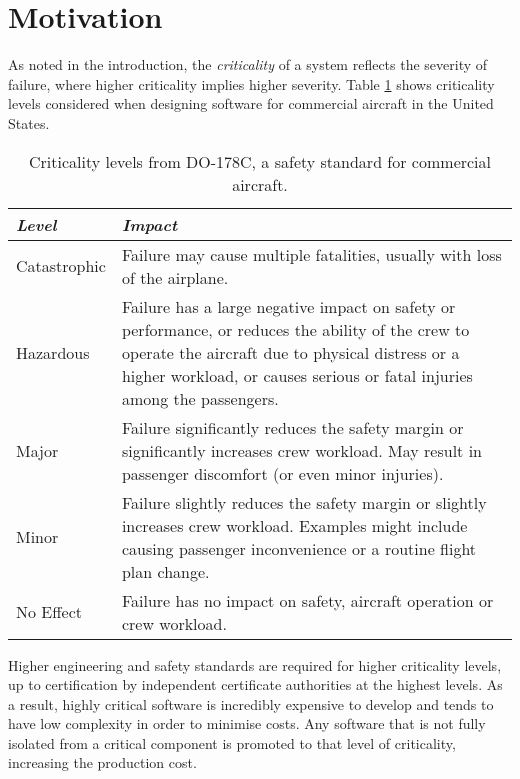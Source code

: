 \section{Motivation}

As noted in the introduction, the \emph{criticality} of a system reflects the
severity of failure, where higher criticality implies higher severity.  Table
\ref{tab:criticality_table} shows criticality levels considered when designing
software for commercial aircraft in the United States.

\begin{table}
     \centering
     \begin{tabular}{ l p{10cm}} \toprule
         \emph{Level}   & \emph{Impact} \\ \midrule
         Catastrophic   & Failure may cause multiple fatalities, usually with loss of the airplane. \\
         Hazardous      & Failure has a large negative impact on safety or performance, or reduces the
                          ability of the crew to operate the aircraft due to physical distress or 
                          a higher workload, or causes serious or fatal injuries among the passengers.\\
         Major          & Failure significantly reduces the safety margin or significantly increases
                          crew workload. May result in passenger discomfort (or even minor
                          injuries).\\
         Minor          & Failure slightly reduces the safety margin or slightly increases crew
                          workload. Examples might include causing passenger inconvenience or a
                          routine flight plan change. \\
         No Effect      & Failure has no impact on safety, aircraft operation or crew workload. \\
         \bottomrule
     \end{tabular}
     \caption[Criticality levels from DO-178C]{Criticality levels from DO-178C, a safety standard for commercial aircraft.}
     \label{tab:criticality_table}
 \end{table}

Higher engineering and safety standards are required for higher criticality levels, up to
certification by independent certificate authorities at the highest levels. As a result, highly
critical software is incredibly expensive to develop and tends to have low complexity in order to
minimise costs. Any software that is not fully isolated from a critical component is promoted to
that level of criticality, increasing the production cost.

